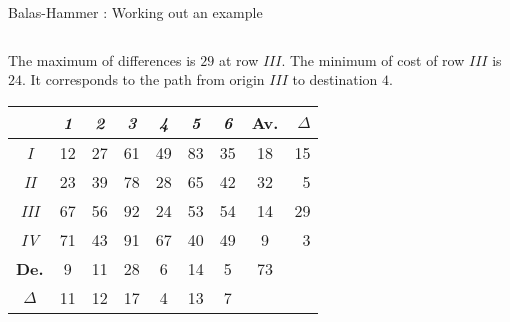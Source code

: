 \documentclass[32pt,aspectratio=169]{beamer}
\begin{document}
\begin{frame}{Balas-Hammer : Working out an example}
  \begin{columns}
    \begin{column}{.6\textwidth}
      The maximum of differences is $29$ at row $III$. The minimum of
      cost of row $III$ is $24$. It corresponds to the path from origin
      $III$ to destination $4$.

      \begin{overlayarea}{\textwidth}{.5\textheight}      
        \vspace{.45cm}
        \small{
          \begin{tabular}{c|c|c|c|c|c|c|c|r}
            & \textit{1} & \textit{2} & \textit{3} & \textit{4} & \textit{5} & \textit{6} & \cellcolor{blue!50}\textbf{Av.} & \color{blue}$\Delta$\\
            \hline
            \textit{I} & \cellcolor{blue!25}12 & \cellcolor{blue!25}27 & \cellcolor{blue!25}61 & \cellcolor{orange}49 & \cellcolor{blue!25}83 & \cellcolor{blue!25}35 & \cellcolor{blue!50}18 & \color{blue}15 \\
            \hline 
            \textit{II} & \cellcolor{blue!25}23 & \cellcolor{blue!25}39 & \cellcolor{blue!25}78 & \cellcolor{orange}28 & \cellcolor{blue!25}65 & \cellcolor{blue!25}42 & \cellcolor{blue!50}32 & \color{blue}5 \\
            \hline
            \cellcolor{orange}\textit{III} & \cellcolor{orange}67 & \cellcolor{orange}56 & \cellcolor{orange}92 & \cellcolor{orange}24 & \cellcolor{orange}53 & \cellcolor{orange}54 & \cellcolor{blue!50}14 & \cellcolor{orange}\color{blue}29 \\
            \hline
            \textit{IV} & \cellcolor{blue!25}71 & \cellcolor{blue!25}43 & \cellcolor{blue!25}91 & \cellcolor{orange}67 & \cellcolor{blue!25}40 & \cellcolor{blue!25}49 & \cellcolor{blue!50}9 & \color{blue}3 \\
            \hline 
            \cellcolor{blue!50}\textbf{De.} & \cellcolor{blue!50}9 & \cellcolor{blue!50}11 & \cellcolor{blue!50}28 & \cellcolor{blue!50}6 & \cellcolor{blue!50}14 & \cellcolor{blue!50}5 & \cellcolor{blue!60}73 & \\            
            \cline{1-8}
            \color{blue}$\Delta$ & \color{blue}11 & \color{blue}12 & \color{blue}17 & \color{blue}4 & \color{blue}13 & \color{blue}7   
          \end{tabular}
        }
      \end{overlayarea}
    \end{column}

\end{columns}
\end{frame}
\end{document}
